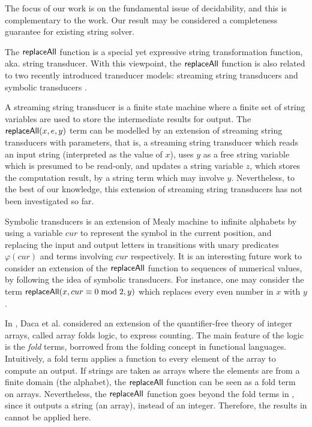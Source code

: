

The focus of our work is on the fundamental issue of decidability, and this is complementary to the work. Our result may be considered a completeness guarantee for existing string solver. 
 
The $\mathsf{replaceAll}$ function is a special yet expressive string transformation function, aka. string transducer. With this viewpoint, 
the $\mathsf{replaceAll}$ function is also related to two recently introduced transducer models: streaming string transducers \cite{AC10} and symbolic transducers \cite{symbolic-transducer}. 

A streaming string transducer is a finite state machine where  a finite set of string variables are used to store the intermediate results for output. The $\mathsf{replaceAll}(x, e, y)$ term can be modelled by an extension of streaming string transducers with parameters, that is, a streaming string transducer which reads an input string (interpreted as the value of $x$), uses $y$ as a free string variable which is presumed to be read-only, and updates a string variable $z$, which stores the computation result, by a string term which may involve $y$. Nevertheless, to the best of our knowledge, this extension of streaming string transducers has not been investigated so far. 

Symbolic transducers is an extension of Mealy machine to infinite alphabets by using a variable $cur$ to represent the symbol in the current position, and replacing the input and output letters in transitions with unary predicates $\varphi(cur)$ and terms involving $cur$ respectively. It is an interesting future work to consider an extension of the $\mathsf{replaceAll}$ function to sequences of numerical values, by following the idea of symbolic transducers. For instance, one may consider the term $\mathsf{replaceAll}(x, cur \equiv 0 \bmod 2, y)$ which replaces every even number in $x$ with $y$.

In \cite{DHK16}, Daca et al. considered an extension of the quantifier-free theory of integer arrays, called array folds logic, to express counting. The main feature of the logic is the \emph{fold} terms, borrowed from the folding concept in functional languages. Intuitively, a fold term applies a function to every element of the array to compute an output. If strings are taken as arrays where the elements are from a finite domain (the alphabet), the $\mathsf{replaceAll}$ function can be seen as a fold term on arrays. Nevertheless, the $\mathsf{replaceAll}$ function goes beyond the fold terms in \cite{DHK16}, since it outputs a string (an array), instead of an integer. Therefore, the results in \cite{DHK16} cannot be applied here.